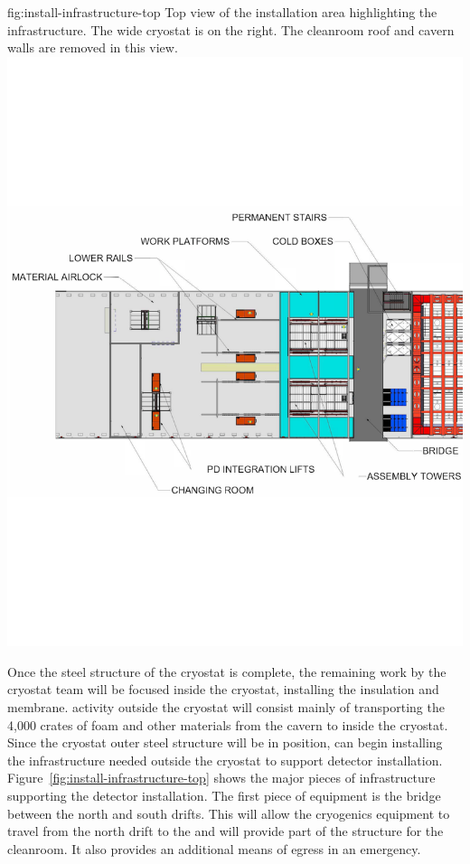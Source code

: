 \begin{dunefigure}{fig:install-infrastructure-top}
  {Top view of the installation area highlighting the infrastructure. The \cryostatwdth wide cryostat is on the right. The cleanroom roof and cavern walls are removed in this view.}
\includegraphics[width=.85\textwidth,trim=0mm 70mm 0mm 70mm,clip]{graphics/install-infrastructure-top-small.pdf} %
\end{dunefigure}

Once the steel structure of the cryostat is complete, the remaining work by the  cryostat team will be focused inside the cryostat, installing the insulation and membrane.  
 activity outside the cryostat will consist mainly of
transporting the 4,000 crates of foam and other materials from the cavern to inside the cryostat. 
Since the cryostat outer steel structure will be in position,  can 
begin installing the infrastructure needed outside the cryostat to support detector installation. %
Figure~\ref{fig:install-infrastructure-top} shows the major pieces of infrastructure supporting the detector installation.
The first piece of equipment is the bridge between the north and south drifts. 
This will allow the cryogenics equipment to travel from the north drift to the  and will provide part of the structure for the cleanroom. It also provides an additional means of egress in an emergency. 

